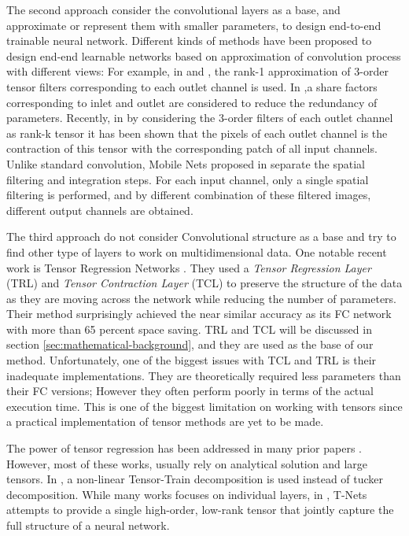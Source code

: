 \documentclass{article}
\begin{document}
The second approach consider the convolutional layers as a base, and approximate or represent them with smaller parameters, to design end-to-end trainable neural network. Different kinds of methods have been proposed to design end-end learnable networks based on approximation of convolution process with different views: For example, in \cite{r28} and \cite{r29} , the rank-1 approximation of 3-order tensor filters corresponding to each outlet channel is used. 
In \cite{r30}  ,a share factors corresponding to inlet and outlet are considered to reduce the redundancy of parameters. 
Recently, in \cite{r31}  by considering  the 3-order filters of each outlet channel as rank-k tensor it has been shown that the pixels of each outlet channel is the contraction of this tensor with the corresponding patch of all input channels.
Unlike standard convolution, Mobile Nets proposed in \cite{r32}  separate the spatial filtering and integration steps. For each input channel, only a single spatial filtering is performed, and by different combination of these filtered images, different output channels are obtained. 

The third approach do not consider Convolutional structure as a base and try to find other type of layers to work on multidimensional data. One notable recent work is Tensor Regression Networks \cite{r1}. They used a \textit{Tensor Regression Layer} (TRL) and \textit{Tensor Contraction Layer} (TCL) to preserve the structure of the data as they are moving across the network while reducing the number of parameters. Their method surprisingly achieved the near similar accuracy as its FC network with more than 65 percent space saving. TRL and TCL will be discussed in section \ref{sec:mathematical-background}, and they are used as the base of our method. Unfortunately, one of the biggest issues with TCL and TRL is their inadequate implementations. They are theoretically required less parameters than their FC versions; However they often perform poorly in terms of the actual execution time. This is one of the biggest limitation on working with tensors since a practical implementation of tensor methods are yet to be made.

The power of tensor regression has been addressed in many prior papers \cite{r17}\cite{r18} \cite{r19} \cite{r20}. However, most of these works, usually rely on analytical solution and large tensors. In \cite{r33}, a non-linear Tensor-Train decomposition is used instead of tucker decomposition. While many works focuses on individual layers, in \cite{r34}, T-Nets attempts to provide a single high-order, low-rank tensor that jointly capture the full structure of a neural network. 
\end{document}
